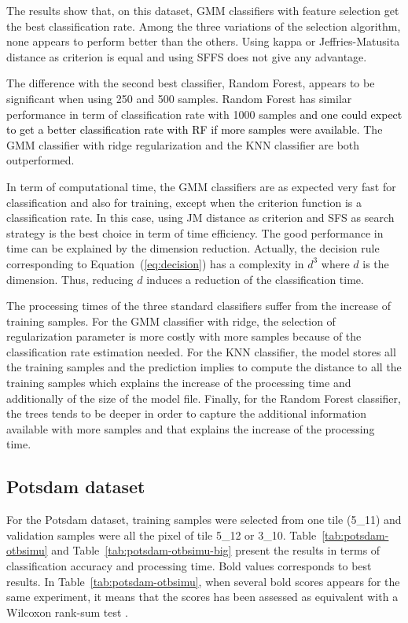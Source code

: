 \documentclass[journal,10pt]{IEEEtran}
\newcommand{\rev}[1]{\textcolor{black}{#1}}
\begin{document}
    The results show that, on this  dataset, GMM classifiers with feature selection get the best classification rate. Among the three variations of the selection algorithm, none appears to perform better than the others. Using kappa or Jeffries-Matusita distance as criterion is equal and using SFFS does not give any advantage.

    The difference with the second best classifier, Random Forest, appears to be significant when using 250 and 500 samples. Random Forest has similar performance in term of classification rate with 1000 samples \rev{and one could expect to get a better classification rate with RF if more samples were available}. The GMM classifier with ridge regularization and the KNN classifier are both outperformed.

    In term of computational time, the GMM classifiers are as expected very fast for classification and also for training, except when the criterion function is a classification rate. In this case, using JM distance as criterion and SFS as search strategy is the best choice in term of time efficiency. The good performance in time can be explained by the dimension reduction. Actually, the decision rule corresponding to Equation~(\ref{eq:decision}) has a complexity in $d^3$ where $d$ is the dimension. Thus, reducing $d$ induces a reduction of the classification time.

    The processing times of the three standard classifiers suffer from the increase of training samples. For the GMM classifier with ridge, the selection of regularization parameter is more costly with more samples because of the classification rate estimation needed. For the KNN classifier, the model stores all the training samples and the prediction implies to compute the distance to all the training samples which explains the increase of the processing time and additionally of the size of the model file. Finally, for the Random Forest classifier, the trees tends to be deeper in order to capture the additional information available with more samples and that explains the increase of the processing time.

    \subsection{Potsdam dataset}

    For the Potsdam  dataset, training samples were  selected from one
    tile (5\_11)  and validation  samples were all  the pixel  of tile
    5\_12     or    3\_10.      Table~\ref{tab:potsdam-otbsimu}    and
    Table~\ref{tab:potsdam-otbsimu-big} present  the results  in terms
    of classification accuracy and processing time. Bold values corresponds to best results. In Table~\ref{tab:potsdam-otbsimu}, when several bold scores appears for the same experiment, it means that the scores has been assessed as equivalent with a Wilcoxon rank-sum test \cite{mann1947test}.
\end{document}
